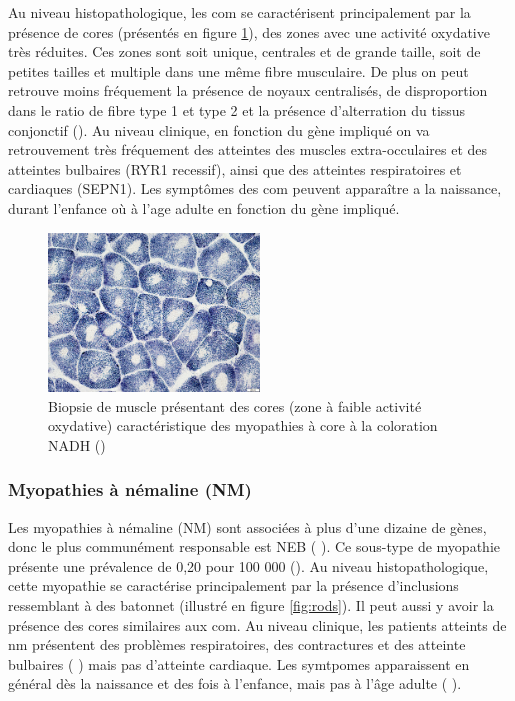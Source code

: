 Au niveau histopathologique, les \gls{com} se caractérisent principalement par la présence de cores (présentés en figure \ref{fig:cores}), des zones avec une activité oxydative très réduites. Ces zones sont soit unique, centrales et de grande taille, soit de petites tailles et multiple dans une même fibre musculaire. De plus on peut retrouve moins fréquement la présence de noyaux centralisés, de disproportion dans le ratio de fibre type 1 et type 2 et la présence d'alterration du tissus conjonctif (\cite{jungbluth_congenital_2018}). Au niveau clinique, en fonction du gène impliqué on va retrouvement très fréquement des atteintes des muscles extra-occulaires et des atteintes bulbaires (RYR1 recessif), ainsi que des atteintes respiratoires et cardiaques (SEPN1). Les  symptômes des \gls{com} peuvent apparaître a la naissance, durant l'enfance où à l'age adulte en fonction du gène impliqué.

\begin{figure}[!ht]
 \centering
 \includegraphics[width=0.5\textwidth]{figures/core.jpg}
 \caption[Biopsie de muscle de myopathies à cores]{Biopsie de muscle présentant des cores (zone à faible activité oxydative) caractéristique des myopathies à core à la coloration NADH (\cite{alan_pestronk_neuromuscular_2022})}
 \label{fig:cores}
\end{figure}

\subsubsection{Myopathies à némaline (NM)}
Les myopathies à némaline (NM) sont associées à plus d'une dizaine de gènes, donc le plus communément responsable est NEB (\cite{jungbluth_congenital_2018} ). Ce sous-type de myopathie présente une prévalence de 0,20 pour 100 000 (\cite{huang_systematic_2021}). Au niveau histopathologique, cette myopathie se caractérise principalement par la présence d'inclusions ressemblant à des batonnet (illustré en figure \ref{fig:rods}). Il peut aussi y avoir la présence des cores similaires aux \gls{com}. Au niveau clinique, les patients atteints de \gls{nm} présentent des problèmes respiratoires, des contractures et des atteinte bulbaires (\cite{jungbluth_congenital_2018} ) mais pas d'atteinte cardiaque. Les symtpomes apparaissent en général dès la naissance et des fois à l'enfance, mais pas à l'âge adulte (\cite{jungbluth_congenital_2018} ).


